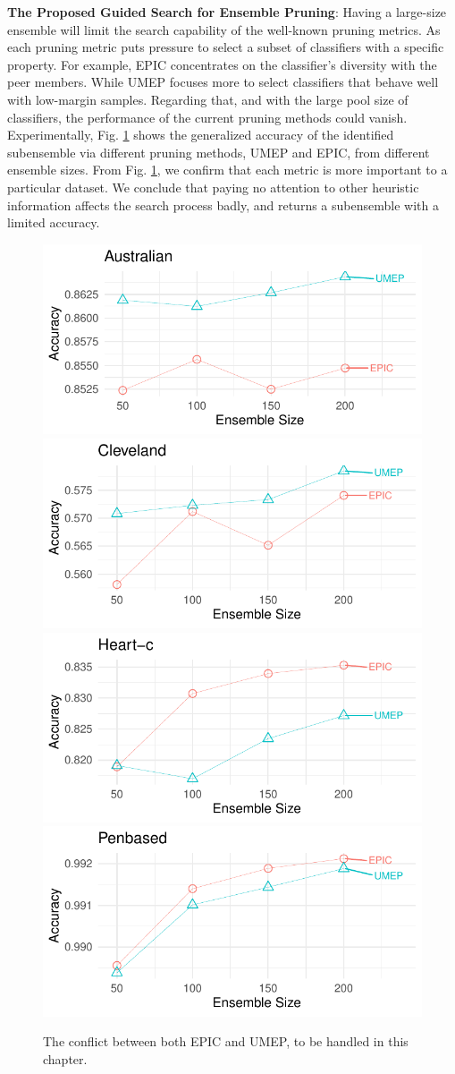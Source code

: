\textbf{The Proposed Guided Search for Ensemble Pruning}: Having a large-size ensemble will limit the search capability of the well-known pruning metrics. As each pruning metric puts pressure to select a subset of classifiers with a specific property. For example, EPIC \cite{lu2010} concentrates on the classifier's diversity with the peer members. While UMEP \cite{guo2013} focuses more to select classifiers that behave well with low-margin samples. Regarding that, and with the large pool size of classifiers, the performance of the current pruning methods could vanish. Experimentally, Fig. \ref{conflicting} shows the generalized accuracy of the identified subensemble via different pruning methods, UMEP and EPIC, from different ensemble sizes. From Fig. \ref{conflicting}, we confirm that each metric is more important to a particular dataset. We conclude that paying no attention to other heuristic information affects the search process badly, and returns a subensemble with a limited accuracy.  

\vspace*{.3cm}
\begin{figure}[h]
\begin{center}\scriptsize
  \includegraphics[width=.497\textwidth]{5_Guided_Search/fig/UMEP-EPIC-Australian.pdf}
  \includegraphics[width=.497\textwidth]{5_Guided_Search/fig/UMEP-EPIC-Cleveland.pdf}\\ 
  \includegraphics[width=.497\textwidth]{5_Guided_Search/fig/UMEP-EPIC-Heart-c.pdf}
   \includegraphics[width=.497\textwidth]{5_Guided_Search/fig/UMEP-EPIC-Penbased.pdf}\\
\end{center}
\caption{The conflict between both EPIC and UMEP, to be handled in this chapter.}
\label{conflicting}
\end{figure}


